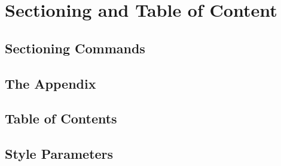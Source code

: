 \section{Sectioning and Table of Content}
\subsection{Sectioning Commands}


\subsection{The Appendix}


\subsection{Table of Contents}


\subsection{Style Parameters}